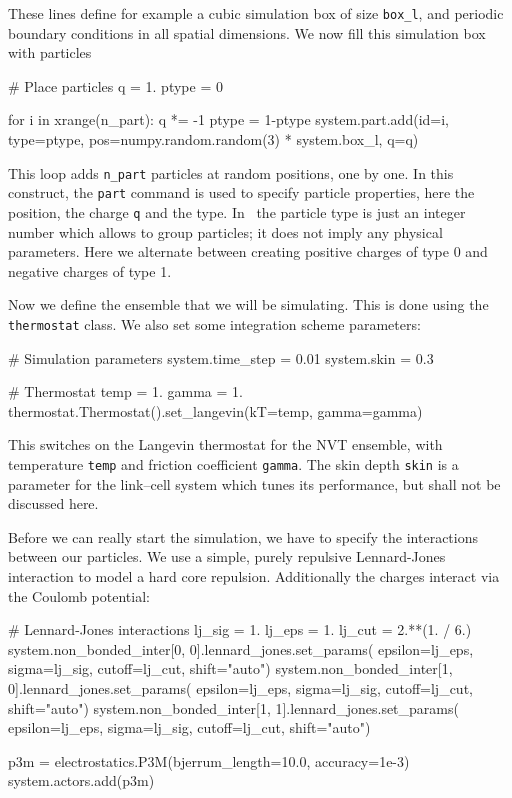 \documentclass[
a4paper,                        %
11pt,                           %
twoside,                        %
footsepline,                    %
headsepline,                    %
headexclude,                    %
footexclude,                    %
pagesize,                       %
]{scrartcl}
\begin{document}
These lines define for example a cubic simulation box of size 
\verb|box_l|, and periodic boundary conditions in all spatial dimensions. 
We now fill this simulation box with particles

\begin{tclcode}
# Place particles
q = 1.
ptype = 0

for i in xrange(n_part):
    q *= -1
    ptype = 1-ptype
    system.part.add(id=i, type=ptype, 
                    pos=numpy.random.random(3) * system.box_l, q=q)
\end{tclcode}

This loop adds \verb|n_part| particles at random positions, one by
one.  In this construct, the \verb|part| command is used to specify 
particle properties, here the position, the charge \verb|q| and the type. 
In \es\ the particle type is just an integer number which allows to group
particles; it does not imply any physical parameters. Here we 
alternate between creating positive charges of type 0 and negative
charges of type 1.

Now we define the ensemble that we will be simulating. This is done
using the \verb|thermostat| class. We also set some integration
scheme parameters:

\begin{tclcode}
# Simulation parameters
system.time_step = 0.01
system.skin = 0.3

# Thermostat
temp = 1.
gamma = 1.
thermostat.Thermostat().set_langevin(kT=temp, gamma=gamma)
\end{tclcode}

This switches on the Langevin thermostat for the NVT ensemble, with
temperature \verb|temp| and friction coefficient \verb|gamma|. The skin depth
\verb|skin| is a parameter for the link--cell system which tunes its
performance, but shall not be discussed here.

Before we can really start the simulation, we have to specify the
interactions between our particles.  We use a simple, purely repulsive
Lennard-Jones interaction to model a hard core repulsion. Additionally the
charges interact via the Coulomb potential:

\begin{tclcode}
# Lennard-Jones interactions
lj_sig = 1.
lj_eps = 1.
lj_cut = 2.**(1. / 6.)
system.non_bonded_inter[0, 0].lennard_jones.set_params(
    epsilon=lj_eps, sigma=lj_sig, cutoff=lj_cut, shift="auto")
system.non_bonded_inter[1, 0].lennard_jones.set_params(
    epsilon=lj_eps, sigma=lj_sig, cutoff=lj_cut, shift="auto")
system.non_bonded_inter[1, 1].lennard_jones.set_params(
    epsilon=lj_eps, sigma=lj_sig, cutoff=lj_cut, shift="auto")

p3m = electrostatics.P3M(bjerrum_length=10.0, accuracy=1e-3)
system.actors.add(p3m)
\end{tclcode}
\end{document}
